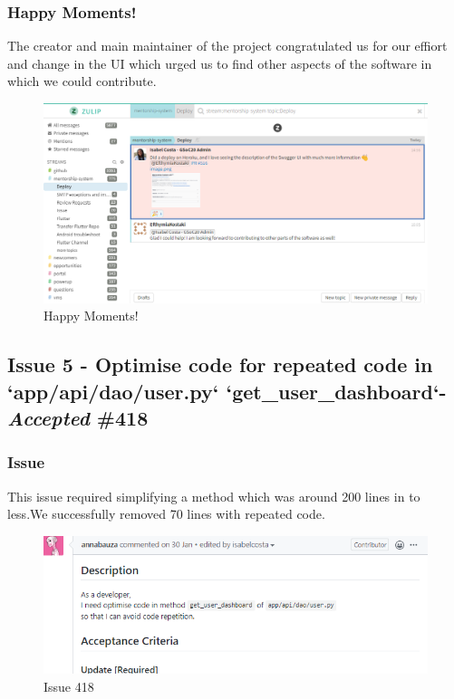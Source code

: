 \documentclass{article}
\begin{document}
\subsubsection{Happy Moments!}
The creator and main maintainer of the project congratulated us for our effiort and change in the UI which urged us to find other aspects of the software in which we could contribute.
\begin{figure}[tph!]
\centerline{\includegraphics[totalheight=10cm, width=15cm]{Happy-Moments.png}}
    \caption{Happy Moments!}
    \label{fig:verticalcell}
\end{figure}
\vfill
\clearpage

\subsection{Issue 5 - Optimise code for repeated code in `app/api/dao/user.py` `get\_user\_dashboard`- \emph{Accepted} \#418}
\subsubsection{Issue}
\hspace{0.5cm}This issue required simplifying a method which was around 200 lines in to less.We successfully removed 70 lines with repeated code.
\begin{figure}[tph!]
\centerline{\includegraphics[totalheight=5cm, width=14cm]{issue418.png}}
    \caption{Issue 418}
    \label{fig:verticalcell}
\end{figure}
\vfill
\clearpage
\end{document}

